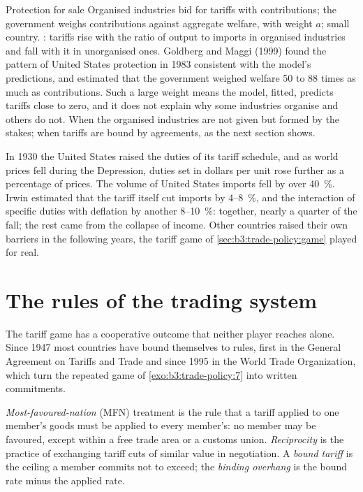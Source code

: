 \begin{model}{Protection for sale}
\assumes Organised industries bid for tariffs with contributions; the government
weighs contributions against aggregate welfare, with weight $a$; small country.
\predicts {}: tariffs rise with the ratio of output to imports in
organised industries and fall with it in unorganised ones.
\tested Goldberg and Maggi (1999) found the pattern of United States protection in
1983 consistent with the model's predictions, and estimated that the government
weighed welfare 50 to 88 times as much as contributions. %
Such a large weight means the model, fitted, predicts tariffs close to zero, and
it does not explain why some industries organise and others do not.
\breaks When the organised industries are not given but formed by the stakes; when
tariffs are bound by agreements, as the next section shows.
\end{model}

\begin{record}
In 1930 the United States raised the duties of its tariff schedule, and as world
prices fell during the Depression, duties set in dollars per unit rose further
as a percentage of prices. The volume of United States imports fell by over 40~\%.
Irwin estimated that the tariff itself cut imports by 4--8~\%, and the interaction
of specific duties with deflation by another 8--10~\%: together, nearly a quarter
of the fall; the rest came from the collapse of income. %
Other countries raised their own barriers in the following years, the tariff game
of \cref{sec:b3:trade-policy:game} played for real.
\end{record}

\section{The rules of the trading system}\label{sec:b3:trade-policy:rules}

The tariff game has a cooperative outcome that neither player reaches alone.
Since 1947 most countries have bound themselves to rules, first in the General
Agreement on Tariffs and Trade and since 1995 in the World Trade Organization,
which turn the repeated game of \cref{exo:b3:trade-policy:7} into written
commitments.

\begin{definition}\label{def:b3:trade-policy:mfn}
\emph{Most-favoured-nation} (MFN) treatment is the rule that a tariff applied to one
member's goods must be applied to every member's: no member may be favoured,
except within a free trade area or a customs union. \emph{Reciprocity} is the
practice of exchanging tariff cuts of similar value in negotiation. A \emph{bound
tariff} is the ceiling a member commits not to exceed; the \emph{binding overhang} is
the bound rate minus the applied rate.
\end{definition}

